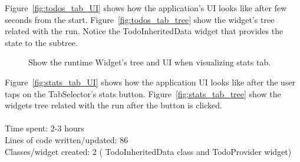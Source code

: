 Figure~\ref{fig:todos_tab_UI} shows how the application's UI looks like after few seconds from the start. Figure~\ref{fig:todos_tab_tree} show the widget's tree related with the run. Notice the TodoInheritedData widget that provides the state to the subtree.
\begin{figure}[H]
    \centering
    \quad
    \caption{Show the runtime Widget's tree and UI when visualizing stats tab.}
    \label{fig:stats_tab}
\end{figure}

Figure~\ref{fig:stats_tab_UI} shows how the application UI looks like after the user taps on the TabSelector's stats button. Figure~\ref{fig:stats_tab_tree} show the widgets tree related with the run after the button is clicked.\\
\\
Time spent: 2-3 hours\\
Lines of code written/updated: 86\\
Classes/widget created: 2 ( TodoInheritedData class and TodoProvider widget)\\




